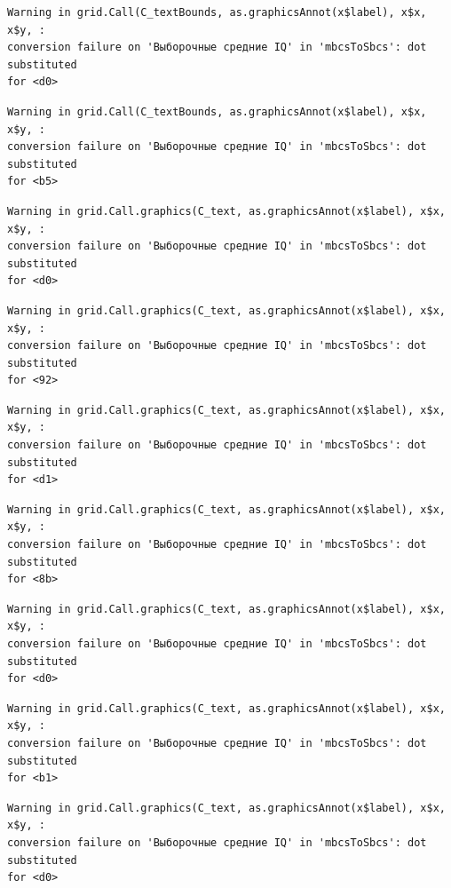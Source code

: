 \documentclass[
  letterpaper,
  DIV=11,
  numbers=noendperiod]{scrreprt}
\theoremstyle{definition}
\theoremstyle{remark}
\begin{document}
\begin{verbatim}
Warning in grid.Call(C_textBounds, as.graphicsAnnot(x$label), x$x, x$y, :
conversion failure on 'Выборочные средние IQ' in 'mbcsToSbcs': dot substituted
for <d0>
\end{verbatim}

\begin{verbatim}
Warning in grid.Call(C_textBounds, as.graphicsAnnot(x$label), x$x, x$y, :
conversion failure on 'Выборочные средние IQ' in 'mbcsToSbcs': dot substituted
for <b5>
\end{verbatim}

\begin{verbatim}
Warning in grid.Call.graphics(C_text, as.graphicsAnnot(x$label), x$x, x$y, :
conversion failure on 'Выборочные средние IQ' in 'mbcsToSbcs': dot substituted
for <d0>
\end{verbatim}

\begin{verbatim}
Warning in grid.Call.graphics(C_text, as.graphicsAnnot(x$label), x$x, x$y, :
conversion failure on 'Выборочные средние IQ' in 'mbcsToSbcs': dot substituted
for <92>
\end{verbatim}

\begin{verbatim}
Warning in grid.Call.graphics(C_text, as.graphicsAnnot(x$label), x$x, x$y, :
conversion failure on 'Выборочные средние IQ' in 'mbcsToSbcs': dot substituted
for <d1>
\end{verbatim}

\begin{verbatim}
Warning in grid.Call.graphics(C_text, as.graphicsAnnot(x$label), x$x, x$y, :
conversion failure on 'Выборочные средние IQ' in 'mbcsToSbcs': dot substituted
for <8b>
\end{verbatim}

\begin{verbatim}
Warning in grid.Call.graphics(C_text, as.graphicsAnnot(x$label), x$x, x$y, :
conversion failure on 'Выборочные средние IQ' in 'mbcsToSbcs': dot substituted
for <d0>
\end{verbatim}

\begin{verbatim}
Warning in grid.Call.graphics(C_text, as.graphicsAnnot(x$label), x$x, x$y, :
conversion failure on 'Выборочные средние IQ' in 'mbcsToSbcs': dot substituted
for <b1>
\end{verbatim}

\begin{verbatim}
Warning in grid.Call.graphics(C_text, as.graphicsAnnot(x$label), x$x, x$y, :
conversion failure on 'Выборочные средние IQ' in 'mbcsToSbcs': dot substituted
for <d0>
\end{verbatim}
\end{document}
